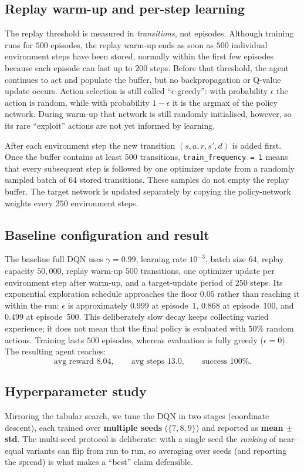 \documentclass[11pt]{article}
\begin{document}
\subsection{Replay warm-up and per-step learning}
The replay threshold is measured in \emph{transitions}, not episodes. Although training runs for
$500$ episodes, the replay warm-up ends as soon as $500$ individual environment steps have been
stored, normally within the first few episodes because each episode can last up to $200$ steps.
Before that threshold, the agent continues to act and populate the buffer, but no backpropagation
or Q-value update occurs. Action selection is still called ``$\epsilon$-greedy'': with probability
$\epsilon$ the action is random, while with probability $1-\epsilon$ it is the argmax of the
policy network. During warm-up that network is still randomly initialised, however, so its rare
``exploit'' actions are not yet informed by learning.

After each environment step the new transition $(s,a,r,s',d)$ is added first. Once the buffer
contains at least $500$ transitions, \texttt{train\_frequency = 1} means that every subsequent
step is followed by one optimizer update from a randomly sampled batch of $64$ stored
transitions. These samples do not empty the replay buffer. The target network is updated
separately by copying the policy-network weights every $250$ environment steps.

\subsection{Baseline configuration and result}
\label{sec:dqn-baseline}
The baseline full DQN uses $\gamma = 0.99$, learning rate $10^{-3}$, batch size $64$,
replay capacity $50{,}000$, replay warm-up $500$ transitions, one optimizer update per
environment step after warm-up, and a target-update period of $250$ steps. Its exponential
exploration schedule approaches the floor $0.05$ rather than reaching it within the run:
$\epsilon$ is approximately $0.999$ at episode~1, $0.868$ at episode~100, and $0.499$ at
episode~500. This deliberately slow decay keeps collecting varied experience; it does not mean
that the final policy is evaluated with $50\%$ random actions. Training lasts $500$ episodes,
whereas evaluation is fully greedy ($\epsilon = 0$). The resulting agent reaches:
\[
  \text{avg reward } 8.04, \qquad \text{avg steps } 13.0, \qquad \text{success } 100\%.
\]

\subsection{Hyperparameter study}
\label{sec:dqn-hpo}
Mirroring the tabular search, we tune the DQN in two stages (coordinate descent), each trained
over \textbf{multiple seeds} ($\{7,8,9\}$) and reported as \textbf{mean $\pm$ std}. The
multi-seed protocol is deliberate: with a single seed the \emph{ranking} of near-equal variants
can flip from run to run, so averaging over seeds (and reporting the spread) is what makes a
``best'' claim defensible.
\end{document}
